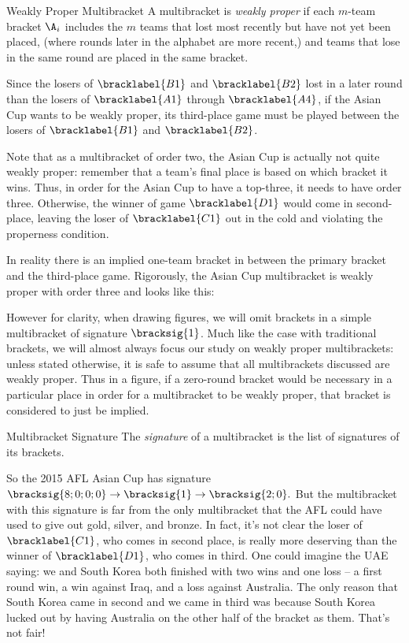 {    \begin{definition}{Weakly Proper Multibracket}{}
        A multibracket is \textit{weakly proper} if each $m$-team bracket $\A_i$ includes the $m$ teams that lost most recently but have not yet been placed, (where rounds later in the alphabet are more recent,) and teams that lose in the same round are placed in the same bracket.
    \end{definition}

    Since the losers of $\bracklabel{B1}$ and $\bracklabel{B2}$ lost in a later round than the losers of $\bracklabel{A1}$ through $\bracklabel{A4}$, if the Asian Cup wants to be weakly proper, its third-place game must be played between the losers of $\bracklabel{B1}$ and $\bracklabel{B2}$.

    Note that as a multibracket of order two, the Asian Cup is actually not quite weakly proper: remember that a team's final place is based on which bracket it wins. Thus, in order for the Asian Cup to have a top-three, it needs to have order three. Otherwise, the winner of game $\bracklabel{D1}$ would come in second-place, leaving the loser of $\bracklabel{C1}$ out in the cold and violating the properness condition.

    In reality there is an implied one-team bracket in between the primary bracket and the third-place game. Rigorously, the Asian Cup multibracket is weakly proper with order three and looks like this:


    However for clarity, when drawing figures, we will omit brackets in a simple multibracket of signature $\bracksig{1}$. Much like the case with traditional brackets, we will almost always focus our study on weakly proper multibrackets: unless stated otherwise, it is safe to assume that all multibrackets discussed are weakly proper. Thus in a figure, if a zero-round bracket would be necessary in a particular place in order for a multibracket to be weakly proper, that bracket is considered to just be implied.

    \begin{definition}{Multibracket Signature}{}
        The \textit{signature} of a multibracket is the list of signatures of its brackets.
    \end{definition}

    So the 2015 AFL Asian Cup has signature $\bracksig{8;0;0;0} \to \bracksig{1} \to \bracksig{2;0}.$ But the multibracket with this signature is far from the only multibracket that the AFL could have used to give out gold, silver, and bronze. In fact, it's not clear the loser of $\bracklabel{C1}$, who comes in second place, is really more deserving than the winner of $\bracklabel{D1}$, who comes in third. One could imagine the UAE saying: we and South Korea both finished with two wins and one loss -- a first round win, a win against Iraq, and a loss against Australia. The only reason that South Korea came in second and we came in third was because South Korea lucked out by having Australia on the other half of the bracket as them. That's not fair!

}
